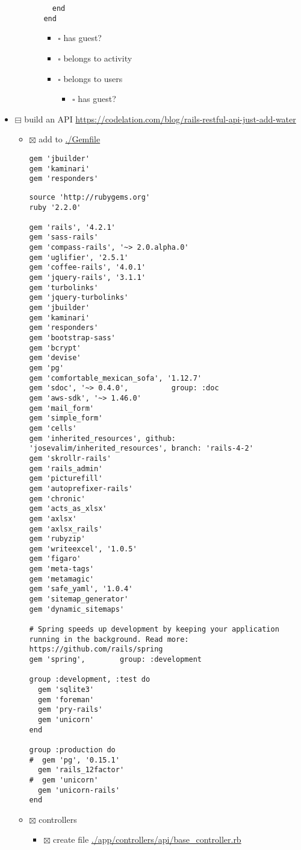 \documentclass[11pt]{article}
\begin{document}
\begin{itemize}
\begin{itemize}
\begin{itemize}
\begin{verbatim}
  end
end
\end{verbatim}
\begin{itemize}
\item $\square$ has guest?
\item $\square$ belongs to activity
\item $\square$ belongs to users
\begin{itemize}
\item $\square$ has guest?
\end{itemize}
\end{itemize}
\end{itemize}
\end{itemize}
\item $\boxminus$ build an API
\url{https://codelation.com/blog/rails-restful-api-just-add-water}
\begin{itemize}
\item $\boxtimes$ add to \url{./Gemfile}

\begin{verbatim}
gem 'jbuilder'
gem 'kaminari'
gem 'responders'
\end{verbatim}

\begin{verbatim}
source 'http://rubygems.org'
ruby '2.2.0'

gem 'rails', '4.2.1'
gem 'sass-rails'
gem 'compass-rails', '~> 2.0.alpha.0'
gem 'uglifier', '2.5.1'
gem 'coffee-rails', '4.0.1'
gem 'jquery-rails', '3.1.1'
gem 'turbolinks'
gem 'jquery-turbolinks'
gem 'jbuilder'
gem 'kaminari'
gem 'responders'
gem 'bootstrap-sass'
gem 'bcrypt'
gem 'devise'
gem 'pg'
gem 'comfortable_mexican_sofa', '1.12.7'
gem 'sdoc', '~> 0.4.0',          group: :doc
gem 'aws-sdk', '~> 1.46.0'
gem 'mail_form'
gem 'simple_form'
gem 'cells'
gem 'inherited_resources', github: 'josevalim/inherited_resources', branch: 'rails-4-2'
gem 'skrollr-rails'
gem 'rails_admin'
gem 'picturefill'
gem 'autoprefixer-rails'
gem 'chronic'
gem 'acts_as_xlsx'
gem 'axlsx'
gem 'axlsx_rails'
gem 'rubyzip'
gem 'writeexcel', '1.0.5'
gem 'figaro'
gem 'meta-tags'
gem 'metamagic'
gem 'safe_yaml', '1.0.4'
gem 'sitemap_generator'
gem 'dynamic_sitemaps'

# Spring speeds up development by keeping your application running in the background. Read more: https://github.com/rails/spring
gem 'spring',        group: :development

group :development, :test do
  gem 'sqlite3'
  gem 'foreman'
  gem 'pry-rails'
  gem 'unicorn'
end

group :production do
#  gem 'pg', '0.15.1'
  gem 'rails_12factor'
#  gem 'unicorn'
  gem 'unicorn-rails'
end
\end{verbatim}
\item $\boxtimes$ controllers
\begin{itemize}
\item $\boxtimes$ create file \url{./app/controllers/api/base_controller.rb}


\end{itemize}
\end{itemize}
\end{itemize}
\end{document}
